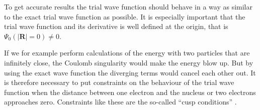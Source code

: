 			To get accurate results the trial wave function should behave in a way as similar to the exact trial wave function as possible. It is especially important that the trial wave function and its derivative is well defined at the origin, that is $\Psi_0 (|\mathbf{R}|=0)\neq 0$. 

			If we for example perform calculations of the energy with two particles that are infinitely close, the Coulomb singularity would make the energy blow up. But by using the exact wave function the diverging terms would cancel each other out. It is therefore necessary to put constraints on the behaviour of the trial wave function when the distance between one electron and the nucleus or two electrons approaches zero. Constraints like these are the so-called ``cusp conditions'' \cite{hjorthjensen2010}.
